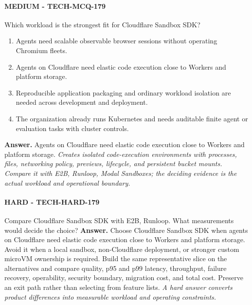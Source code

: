 \paragraph{MEDIUM - TECH-MCQ-179} Which workload is the strongest fit for Cloudflare Sandbox SDK?
\begin{enumerate}[label=\Alph*.]
\item Agents need scalable observable browser sessions without operating Chromium fleets.
\item Agents on Cloudflare need elastic code execution close to Workers and platform storage.
\item Reproducible application packaging and ordinary workload isolation are needed across development and deployment.
\item The organization already runs Kubernetes and needs auditable finite agent or evaluation tasks with cluster controls.
\end{enumerate}
\textbf{Answer.} Agents on Cloudflare need elastic code execution close to Workers and platform storage.
\textit{Creates isolated code-execution environments with processes, files, networking policy, previews, lifecycle, and persistent bucket mounts. Compare it with E2B, Runloop, Modal Sandboxes; the deciding evidence is the actual workload and operational boundary.}
\paragraph{HARD - TECH-HARD-179} Compare Cloudflare Sandbox SDK with E2B, Runloop. What measurements would decide the choice?
\textbf{Answer.} Choose Cloudflare Sandbox SDK when agents on Cloudflare need elastic code execution close to Workers and platform storage. Avoid it when a local sandbox, non-Cloudflare deployment, or stronger custom microVM ownership is required. Build the same representative slice on the alternatives and compare quality, p95 and p99 latency, throughput, failure recovery, operability, security boundary, migration cost, and total cost. Preserve an exit path rather than selecting from feature lists.
\textit{A hard answer converts product differences into measurable workload and operating constraints.}

